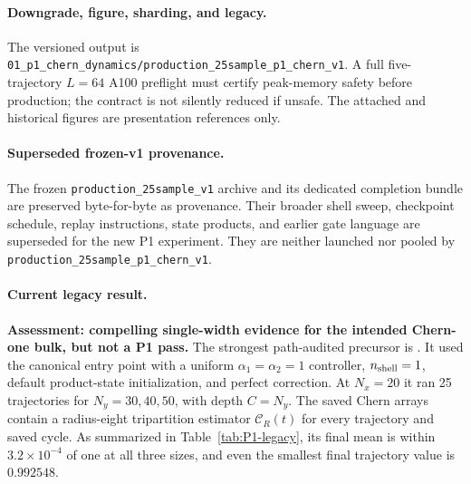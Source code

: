 \documentclass[aps,prx,twocolumn,floatfix,nofootinbib,superscriptaddress,longbibliography]{revtex4-2}
\newcommand{\code}[1]{\texttt{#1}}
\begin{document}
\paragraph*{Downgrade, figure, sharding, and legacy.}
The versioned output is
\code{01\_p1\_chern\_dynamics/production\_25sample\_p1\_chern\_v1}.  A full
five-trajectory $L=64$ A100 preflight must certify peak-memory safety before production;
the contract is not silently reduced if unsafe.  The attached and historical figures are
presentation references only.

\paragraph*{Superseded frozen-v1 provenance.}
The frozen \code{production\_25sample\_v1} archive and its dedicated completion bundle are
preserved byte-for-byte as provenance.  Their broader shell sweep, checkpoint schedule,
replay instructions, state products, and earlier gate language are superseded for the new
P1 experiment.  They are neither launched nor pooled by
\code{production\_25sample\_p1\_chern\_v1}.

\paragraph*{Current legacy result.}
\textbf{Assessment: compelling single-width evidence for the intended Chern-one bulk, but
not a P1 pass.}
The strongest path-audited precursor is
.  It used the canonical
 entry point with a uniform
$\alpha_1=\alpha_2=1$ controller, $n_{\rm shell}=1$, default product-state
initialization, and perfect correction.  At $N_x=20$ it ran 25 trajectories for
$N_y=30,40,50$, with depth $C=N_y$.  The saved Chern arrays contain a radius-eight
tripartition estimator
$\mathcal C_R(t)$ for every trajectory and saved cycle.  As summarized in
Table~\ref{tab:P1-legacy}, its final mean is within $3.2\times10^{-4}$ of one at
all three sizes, and even the smallest final trajectory value is $0.992548$.
\end{document}
